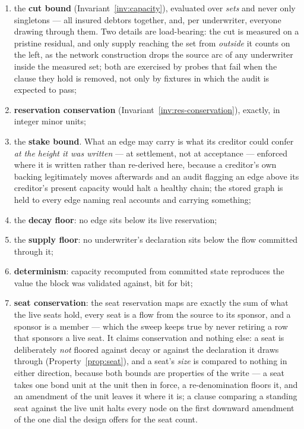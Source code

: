 \begin{enumerate}[leftmargin=1.6em]
  \item the \textbf{cut bound} (Invariant~\ref{inv:capacity}), evaluated over \emph{sets}
        and never only singletons --- all insured debtors together, and, per underwriter,
        everyone drawing through them. Two details are load-bearing: the cut is measured
        on a pristine residual, and only supply reaching the set from \emph{outside} it
        counts on the left, as the network construction drops the source arc of any
        underwriter inside the measured set; both are exercised by probes that fail when
        the clause they hold is removed, not only by fixtures in which the audit is
        expected to pass;
  \item \textbf{reservation conservation} (Invariant~\ref{inv:res-conservation}), exactly,
        in integer minor units;
  \item the \textbf{stake bound}. What an edge may carry is what its creditor could confer
        \emph{at the height it was written} --- at settlement, not at acceptance ---
        enforced where it is written rather than re-derived here, because a creditor's
        own backing legitimately moves afterwards and an audit flagging an edge above its
        creditor's present capacity would halt a healthy chain; the stored graph is held
        to every edge naming real accounts and carrying something;
  \item the \textbf{decay floor}: no edge sits below its live reservation;
  \item the \textbf{supply floor}: no underwriter's declaration sits below the flow
        committed through it;
  \item \textbf{determinism}: capacity recomputed from committed state reproduces the
        value the block was validated against, bit for bit;
  \item \textbf{seat conservation}: the seat reservation maps are exactly the sum of what
        the live seats hold, every seat is a flow from the source to its sponsor, and a
        sponsor is a member --- which the sweep keeps true by never retiring a row that
        sponsors a live seat. It claims conservation and nothing else: a seat is
        deliberately \emph{not} floored against decay or against the declaration it draws
        through (Property~\ref{prop:seat}), and a seat's \emph{size} is compared to
        nothing in either direction, because both bounds are properties of the write --- a
        seat takes one bond unit at the unit then in force, a re-denomination floors it,
        and an amendment of the unit leaves it where it is; a clause comparing a standing
        seat against the live unit halts every node on the first downward amendment of the
        one dial the design offers for the seat count.
\end{enumerate}

